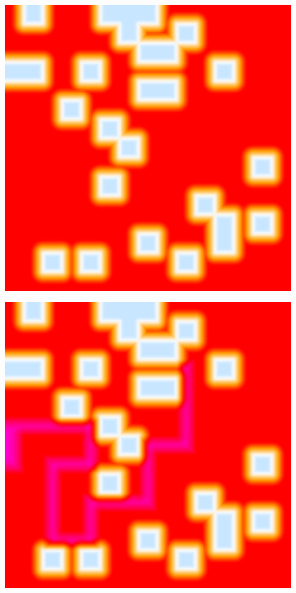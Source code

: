 \begin{center}
\begin{minipage}{.07\textwidth}
        \small{\ \\\ \\\ \\\ }
    \end{minipage}%
    \begin{minipage}{.31\textwidth}
        \centering
        \includegraphics[width=0.95\textwidth]{img/noise expr step1.png}
        \small{}
    \end{minipage}%
    \begin{minipage}{.31\textwidth}
        \centering
        \includegraphics[width=0.95\textwidth]{img/noise expr step2.png}

\end{minipage}
\end{center}
